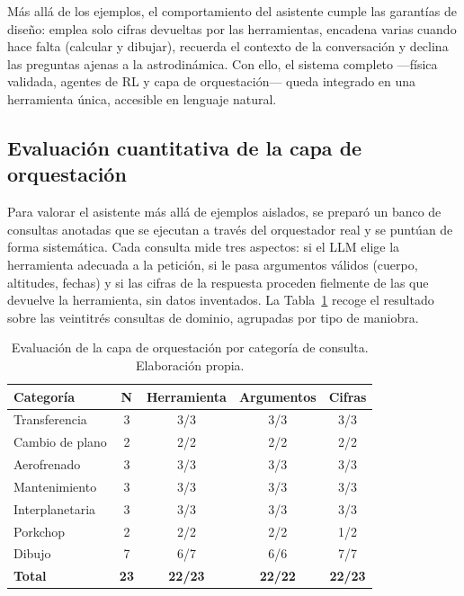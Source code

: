 Más allá de los ejemplos, el comportamiento del asistente cumple las garantías de diseño: emplea solo cifras devueltas por las herramientas, encadena varias cuando hace falta (calcular y dibujar), recuerda el contexto de la conversación y declina las preguntas ajenas a la astrodinámica. Con ello, el sistema completo ---física validada, agentes de \gls{RL} y capa de orquestación--- queda integrado en una herramienta única, accesible en lenguaje natural.

\subsection{Evaluación cuantitativa de la capa de orquestación}
\label{sec:res-ia-llm-eval}

Para valorar el asistente más allá de ejemplos aislados, se preparó un banco de consultas anotadas que se ejecutan a través del orquestador real y se puntúan de forma sistemática. Cada consulta mide tres aspectos: si el \gls{LLM} elige la herramienta adecuada a la petición, si le pasa argumentos válidos (cuerpo, altitudes, fechas) y si las cifras de la respuesta proceden fielmente de las que devuelve la herramienta, sin datos inventados. La Tabla~\ref{tab:res-llm-eval} recoge el resultado sobre las veintitrés consultas de dominio, agrupadas por tipo de maniobra.

\begin{table}[htbp]
  \centering
  \caption{Evaluación de la capa de orquestación por categoría de consulta. Elaboración propia.}
  \label{tab:res-llm-eval}
  \begin{tabular}{lcccc}
    \hline\hline
    \textbf{Categoría} & \textbf{N} & \textbf{Herramienta} & \textbf{Argumentos} & \textbf{Cifras} \\
    \hline
    Transferencia   & 3 & 3/3 & 3/3 & 3/3 \\
    Cambio de plano & 2 & 2/2 & 2/2 & 2/2 \\
    Aerofrenado     & 3 & 3/3 & 3/3 & 3/3 \\
    Mantenimiento   & 3 & 3/3 & 3/3 & 3/3 \\
    Interplanetaria & 3 & 3/3 & 3/3 & 3/3 \\
    Porkchop        & 2 & 2/2 & 2/2 & 1/2 \\
    Dibujo          & 7 & 6/7 & 6/6 & 7/7 \\
    \hline
    \textbf{Total}           & \textbf{23} & \textbf{22/23} & \textbf{22/22} & \textbf{22/23} \\
    \hline\hline
  \end{tabular}
\end{table}

